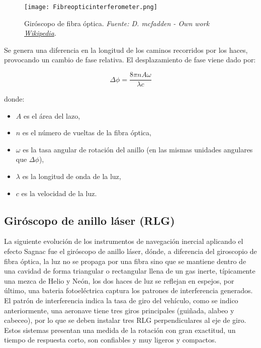 \begin{figure}[H]
    \centering
    \texttt{[image: 
Fibreopticinterferometer.png]}
    \caption{\centering Giróscopo de fibra óptica.\textit{ Fuente: D. mcfadden - Own work \href{https://commons.wikimedia.org/w/index.php?curid=9441115}{Wikipedia}.}}
    \label{fig:cabes}
\end{figure}

Se genera una diferencia en la longitud de los caminos recorridos por los haces, provocando un cambio de fase relativa. El desplazamiento de fase viene dado por:

\begin{equation}
\Delta \phi = \frac{8\pi n A \omega}{\lambda c}
\end{equation}

donde:
\begin{itemize}
    \item \( A \) es el área del lazo,
    \item \( n \) es el número de vueltas de la fibra óptica,
    \item \( \omega \) es la tasa angular de rotación del anillo (en las mismas unidades angulares que \(\Delta \phi\)),
    \item \( \lambda \) es la longitud de onda de la luz,
    \item \( c \) es la velocidad de la luz.
\end{itemize}

\subsection{Giróscopo de anillo láser (RLG)}

La siguiente evolución de los instrumentos de navegación inercial aplicando el efecto Sagnac fue el giróscopo de anillo láser, dónde, a diferencia del giroscopio de fibra óptica, la luz no se propaga por una fibra sino que se mantiene dentro de una cavidad de forma triangular o rectangular llena de un gas inerte, típicamente una mezca de Helio y Neón, los dos haces de luz se reflejan en espejos, por último, una bateria fotoeléctrica captura los patrones de interferencia generados. El patrón de interferencia indica la tasa de giro del vehículo, como se indico anteriormente, una aeronave tiene tres giros principales (guiñada, alabeo y cabeceo), por lo que se deben instalar tres RLG perpendiculares al eje de giro. Estos sistemas presentan una medida de la rotación con gran exactitud, un tiempo de respuesta corto, son confiables y muy ligeros y compactos. 

